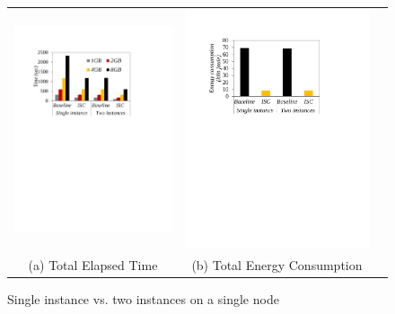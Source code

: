 


\begin{figure}[htbp]
  \centering
  \renewcommand{\tabcolsep}{0.1mm}
  \begin{tabular}{ccc}
 \includegraphics[width=0.5\columnwidth]{figures/Hadoop_total_execution_time_single_two_nodes.pdf}&
  \includegraphics[width=0.5\columnwidth]{figures/Hadoop_power_consumption_single_node.pdf}\\	
  (a) Total Elapsed Time & (b) Total Energy Consumption
\end{tabular}
  \caption{Single instance vs. two instances on a single node}
  \label{fig:execution_time_with_two_namenode_on_single_node}
 \end{figure}




